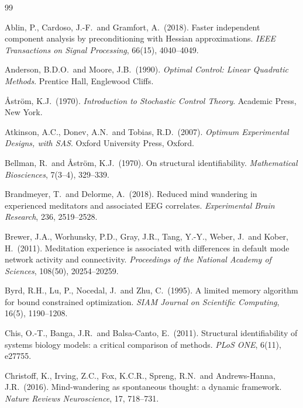 \renewcommand{\refname}{Tài liệu tham khảo}
\begin{thebibliography}{99}
\small

Ablin, P., Cardoso, J.-F.\ and Gramfort, A.\ (2018).
Faster independent component analysis by preconditioning with Hessian approximations.
\textit{IEEE Transactions on Signal Processing}, 66(15), 4040--4049.

Anderson, B.D.O.\ and Moore, J.B.\ (1990).
\textit{Optimal Control: Linear Quadratic Methods}. Prentice Hall, Englewood Cliffs.

\AA{}str\"om, K.J.\ (1970).
\textit{Introduction to Stochastic Control Theory}. Academic Press, New York.

Atkinson, A.C., Donev, A.N.\ and Tobias, R.D.\ (2007).
\textit{Optimum Experimental Designs, with SAS}. Oxford University Press, Oxford.

Bellman, R.\ and \AA{}str\"om, K.J.\ (1970).
On structural identifiability.
\textit{Mathematical Biosciences}, 7(3--4), 329--339.

Brandmeyer, T.\ and Delorme, A.\ (2018).
Reduced mind wandering in experienced meditators and associated EEG correlates.
\textit{Experimental Brain Research}, 236, 2519--2528.

Brewer, J.A., Worhunsky, P.D., Gray, J.R., Tang, Y.-Y., Weber, J.\ and Kober, H.\ (2011).
Meditation experience is associated with differences in default mode network activity and connectivity.
\textit{Proceedings of the National Academy of Sciences}, 108(50), 20254--20259.

Byrd, R.H., Lu, P., Nocedal, J.\ and Zhu, C.\ (1995).
A limited memory algorithm for bound constrained optimization.
\textit{SIAM Journal on Scientific Computing}, 16(5), 1190--1208.

Chis, O.-T., Banga, J.R.\ and Balsa-Canto, E.\ (2011).
Structural identifiability of systems biology models: a critical comparison of methods.
\textit{PLoS ONE}, 6(11), e27755.

Christoff, K., Irving, Z.C., Fox, K.C.R., Spreng, R.N.\ and Andrews-Hanna, J.R.\ (2016).
Mind-wandering as spontaneous thought: a dynamic framework.
\textit{Nature Reviews Neuroscience}, 17, 718--731.


\end{thebibliography}
